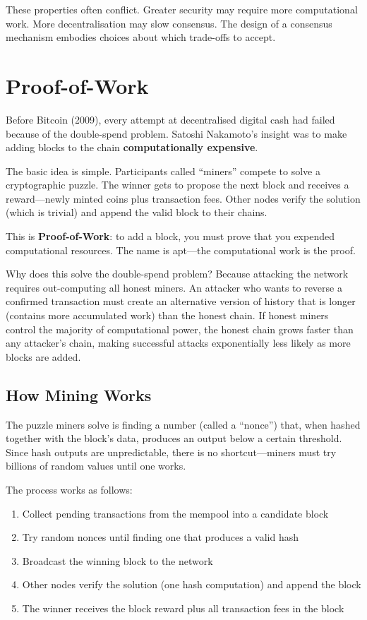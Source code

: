 \documentclass[11pt,a4paper]{article}
\newcommand{\keyword}[1]{\textbf{\textcolor{AccentOrange}{#1}}}
\begin{document}
These properties often conflict. Greater security may require more computational work. More decentralisation may slow consensus. The design of a consensus mechanism embodies choices about which trade-offs to accept.

\section{Proof-of-Work}

Before Bitcoin (2009), every attempt at decentralised digital cash had failed because of the double-spend problem. Satoshi Nakamoto's insight was to make adding blocks to the chain \keyword{computationally expensive}.

The basic idea is simple. Participants called ``miners'' compete to solve a cryptographic puzzle. The winner gets to propose the next block and receives a reward---newly minted coins plus transaction fees. Other nodes verify the solution (which is trivial) and append the valid block to their chains.

This is \keyword{Proof-of-Work}: to add a block, you must prove that you expended computational resources. The name is apt---the computational work is the proof.

Why does this solve the double-spend problem? Because attacking the network requires out-computing all honest miners. An attacker who wants to reverse a confirmed transaction must create an alternative version of history that is longer (contains more accumulated work) than the honest chain. If honest miners control the majority of computational power, the honest chain grows faster than any attacker's chain, making successful attacks exponentially less likely as more blocks are added.

\subsection{How Mining Works}

The puzzle miners solve is finding a number (called a ``nonce'') that, when hashed together with the block's data, produces an output below a certain threshold. Since hash outputs are unpredictable, there is no shortcut---miners must try billions of random values until one works.

The process works as follows:
\begin{enumerate}
    \item Collect pending transactions from the mempool into a candidate block
    \item Try random nonces until finding one that produces a valid hash
    \item Broadcast the winning block to the network
    \item Other nodes verify the solution (one hash computation) and append the block
    \item The winner receives the block reward plus all transaction fees in the block
\end{enumerate}
\end{document}
